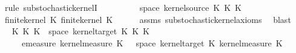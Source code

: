 \begin{isabellebody}
%
\isadelimproof
%
\endisadelimproof
%
\isatagproof
{}\isamarkupfalse%
\ {\isacharparenleft}{\kern0pt}rule\ substochastic{\isacharunderscore}{\kern0pt}kernelI{\isacharparenright}{\kern0pt}\isanewline
\ \ \isamarkupfalse%
\ {\isasymomega}\ \isamarkupfalse%
\ {\isacharasterisk}{\kern0pt}{\isacharcolon}{\kern0pt}\ {\isachardoublequoteopen}{\isasymomega}\ {\isasymin}\ space\ {\isacharparenleft}{\kern0pt}kernel{\isacharunderscore}{\kern0pt}source\ {\isacharparenleft}{\kern0pt}K{\isacharunderscore}{\kern0pt}{}\ {\isasymOtimes}\isactrlsub K\ K{\isacharunderscore}{\kern0pt}{}{\isacharparenright}{\kern0pt}{\isacharparenright}{\kern0pt}{\isachardoublequoteclose}\isanewline
\ \ \isamarkupfalse%
\ {\isachardoublequoteopen}finite{\isacharunderscore}{\kern0pt}kernel\ K{\isacharunderscore}{\kern0pt}{}{\isachardoublequoteclose}\ {\isachardoublequoteopen}finite{\isacharunderscore}{\kern0pt}kernel\ K{\isacharunderscore}{\kern0pt}{}{\isachardoublequoteclose}\isanewline
\ \ \ \ \isamarkupfalse%
\ assms\ substochastic{\isacharunderscore}{\kern0pt}kernel{\isachardot}{\kern0pt}axioms{\isacharparenleft}{\kern0pt}{}{\isacharparenright}{\kern0pt}\ \isamarkupfalse%
\ blast{\isacharplus}{\kern0pt}\isanewline
\ \ \isamarkupfalse%
\ \isamarkupfalse%
\ {\isachardoublequoteopen}{\isacharparenleft}{\kern0pt}K{\isacharunderscore}{\kern0pt}{}\ {\isasymOtimes}\isactrlsub K\ K{\isacharunderscore}{\kern0pt}{}{\isacharparenright}{\kern0pt}\ {\isasymomega}\ {\isacharparenleft}{\kern0pt}space\ {\isacharparenleft}{\kern0pt}kernel{\isacharunderscore}{\kern0pt}target\ {\isacharparenleft}{\kern0pt}K{\isacharunderscore}{\kern0pt}{}\ {\isasymOtimes}\isactrlsub K\ K{\isacharunderscore}{\kern0pt}{}{\isacharparenright}{\kern0pt}{\isacharparenright}{\kern0pt}{\isacharparenright}{\kern0pt}\ {\isasymle}\isanewline
\ \ \ {\isasymintegral}\isactrlsup {\isacharplus}{\kern0pt}\ {\isasymomega}\ emeasure\ {\isacharparenleft}{\kern0pt}kernel{\isacharunderscore}{\kern0pt}measure\ K{\isacharunderscore}{\kern0pt}{}\ {\isacharparenleft}{\kern0pt}{\isasymomega}{\isacharcomma}{\kern0pt}\ {\isasymomega}\ {\isacharparenleft}{\kern0pt}space\ {\isacharparenleft}{\kern0pt}kernel{\isacharunderscore}{\kern0pt}target\ K{\isacharunderscore}{\kern0pt}{}{\isacharparenright}{\kern0pt}{\isacharparenright}{\kern0pt}\ {\isasympartial}kernel{\isacharunderscore}{\kern0pt}measure\ K{\isacharunderscore}{\kern0pt}{}\ {\isasymomega}{\isachardoublequoteclose}\isanewline

\end{isabellebody}
